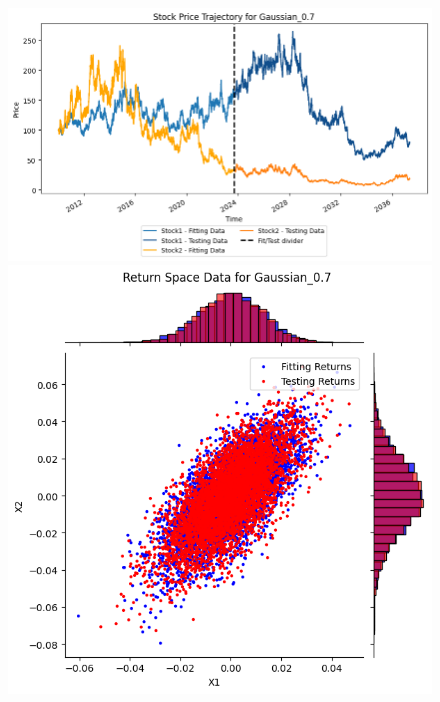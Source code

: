 \begin{figure}
\begin{minipage}{0.9\textwidth}
\begin{minipage}{0.34\textwidth}
        \end{minipage}
    \end{minipage}
    \vfill
    \begin{minipage}{0.9\textwidth}
        \centering
        \begin{minipage}{0.54\textwidth}
            \centering
            \includegraphics[width=\textwidth]{4Method/pictures/PricesGaussian_07.png}
        \end{minipage}
        \hfill
        \begin{minipage}{0.34\textwidth}
            \centering
            \includegraphics[width=\textwidth]{4Method/pictures/ReturnsGaussian_07.png}

\end{minipage}
\end{minipage}
\end{figure}
